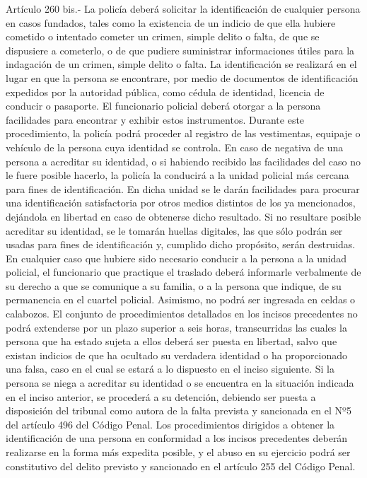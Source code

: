     Artículo 260 bis.- La policía deberá solicitar la identificación de cualquier persona en casos fundados, tales como la existencia de un indicio de que ella hubiere cometido o intentado cometer un crimen, simple delito o falta, de que se dispusiere a cometerlo, o de que pudiere suministrar informaciones útiles para la indagación de un crimen, simple delito o falta. La identificación se realizará en el lugar en que la persona se encontrare, por medio de documentos de identificación expedidos por la autoridad pública, como cédula de identidad, licencia de conducir o pasaporte.
    El funcionario policial deberá otorgar a la persona facilidades para encontrar y exhibir estos instrumentos.
    Durante este procedimiento, la policía podrá proceder al registro de las vestimentas, equipaje o vehículo de la persona cuya identidad se controla.
    En caso de negativa de una persona a acreditar su identidad, o si habiendo recibido las facilidades del caso no le fuere posible hacerlo, la policía la conducirá a la unidad policial más cercana para fines de identificación. En dicha unidad se le darán facilidades para procurar una identificación satisfactoria por otros medios distintos de los ya mencionados, dejándola en libertad en caso de obtenerse dicho resultado. Si no resultare posible acreditar su identidad, se le tomarán huellas digitales, las que sólo podrán ser usadas para fines de identificación y, cumplido dicho propósito, serán destruidas.
    En cualquier caso que hubiere sido necesario conducir a la persona a la unidad policial, el funcionario que practique el traslado deberá informarle verbalmente de su derecho a que se comunique a su familia, o a la persona que indique, de su permanencia en el cuartel policial. Asimismo, no podrá ser ingresada en celdas o calabozos.
    El conjunto de procedimientos detallados en los incisos precedentes no podrá extenderse por un plazo superior a seis horas, transcurridas las cuales la persona que ha estado sujeta a ellos deberá ser puesta en libertad, salvo que existan indicios de que ha ocultado su verdadera identidad o ha proporcionado una falsa, caso en el cual se estará a lo dispuesto en el inciso siguiente.
    Si la persona se niega a acreditar su identidad o se encuentra en la situación indicada en el inciso anterior, se procederá a su detención, debiendo ser puesta a disposición del tribunal como autora de la falta prevista y sancionada en el Nº5 del artículo 496 del Código Penal.
    Los procedimientos dirigidos a obtener la identificación de una persona en conformidad a los incisos precedentes deberán realizarse en la forma más expedita posible, y el abuso en su ejercicio podrá ser constitutivo del delito previsto y sancionado en el artículo 255 del Código Penal.

